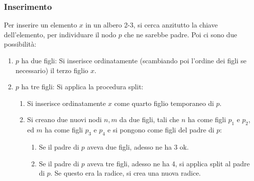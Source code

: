 \documentclass[a4paper,10pt]{article}
\theoremstyle{definition}
\begin{document}
\subsubsection{Inserimento}
Per inserire un elemento $x$ in un albero 2-3, si cerca anzitutto la chiave dell'elemento, per individuare il nodo $p$ che ne sarebbe padre. Poi ci sono due possibilità: 
\begin{enumerate}
 \item $p$ ha due figli: Si inserisce ordinatamente (scambiando poi l'ordine dei figli se necessario) il terzo figlio $x$.
 \item $p$ ha tre figli: Si applica la procedura split:
 \begin{enumerate}
  \item Si inserisce ordinatamente $x$ come quarto figlio temporaneo di $p$.
  \item Si creano due nuovi nodi $n, m$ da due figli, tali che $n$ ha come figli $p_1$ e $p_2$, ed $m$ ha come figli $p_3$ e $p_4$ e si pongono come figli del padre di $p$:
  \begin{enumerate}
   \item Se il padre di $p$ aveva due figli, adesso ne ha 3 ok.
   \item Se il padre di $p$ aveva tre figli, adesso ne ha 4, si applica split al padre di $p$. Se questo era la radice, si crea una nuova radice.
  \end{enumerate}

 \end{enumerate}
\end{enumerate}
\end{document}
